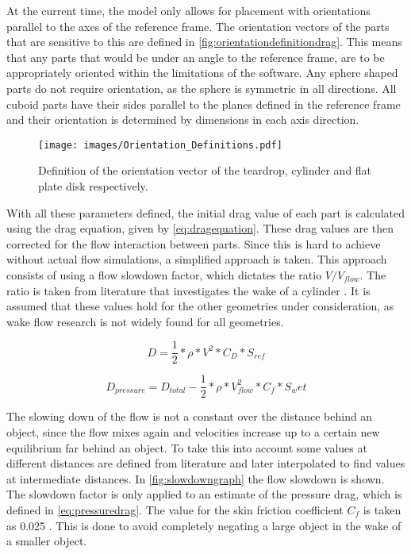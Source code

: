 \noindent At the current time, the model only allows for placement with orientations parallel to the axes of the reference frame. The orientation vectors of the parts that are sensitive to this are defined in \autoref{fig:orientationdefinitiondrag}. This means that any parts that would be under an angle to the reference frame, are to be appropriately oriented within the limitations of the software. Any sphere shaped parts do not require orientation, as the sphere is symmetric in all directions. All cuboid parts have their sides parallel to the planes defined in the reference frame and their orientation is determined by dimensions in each axis direction.

\begin{figure}[H]
	\centering
	\texttt{[image: images/Orientation\_Definitions.pdf]}
	\caption{Definition of the orientation vector of the teardrop, cylinder and flat plate disk respectively.}
	\label{fig:orientationdefinitiondrag}
\end{figure}

\noindent With all these parameters defined, the initial drag value of each part is calculated using the drag equation, given by \autoref{eq:dragequation}. These drag values are then corrected for the flow interaction between parts. Since this is hard to achieve without actual flow simulations, a simplified approach is taken. This approach consists of using a flow slowdown factor, which dictates the ratio $V/V_{flow}$. The ratio is taken from literature that investigates the wake of a cylinder \cite{WakeFlow}. It is assumed that these values hold for the other geometries under consideration, as wake flow research is not widely found for all geometries.

\begin{equation}
	D = \frac{1}{2} * \rho * V^2 * C_D * S_{ref}
	\label{eq:dragequation}
\end{equation}

\begin{equation}
	D_{pressure} = D_{total} - \frac{1}{2} * \rho * V_{flow}^2 * C_f * S_wet
	\label{eq:pressuredrag}
\end{equation}

The slowing down of the flow is not a constant over the distance behind an object, since the flow mixes again and velocities increase up to a certain new equilibrium far behind an object. To take this into account some values at different distances are defined from literature and later interpolated to find values at intermediate distances. In \autoref{fig:slowdowngraph} the flow slowdown is shown. The slowdown factor is only applied to an estimate of the pressure drag, which is defined in \autoref{eq:pressuredrag}. The value for the skin friction coefficient $C_f$ is taken as 0.025 \cite{FlatPlateFlow}. This is done to avoid completely negating a large object in the wake of a smaller object.


